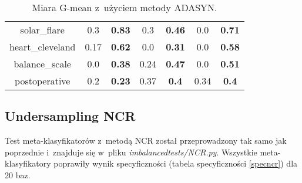 \begin{table}[H]
\begin{center}
{\begin{tabular}{c|cccccc}
					solar\_flare&0.3&\textbf{0.83}&0.3&\textbf{0.46}&0.0&\textbf{0.71}\\%
					heart\_cleveland&0.17&\textbf{0.62}&0.0&\textbf{0.31}&0.0&\textbf{0.58}\\%
					balance\_scale&0.0&\textbf{0.38}&0.24&\textbf{0.47}&0.0&\textbf{0.51}\\%
					postoperative&0.2&\textbf{0.23}&0.37&\textbf{0.4}&0.34&\textbf{0.4}\\%
				\end{tabular}}
				\caption{Miara G-mean z~użyciem metody ADASYN.}
				\label{gmeanadasyn}
			\end{center}
		\end{table}
		
\subsection{Undersampling NCR}
Test meta-klasyfikatorów z~metodą NCR został przeprowadzony tak samo jak poprzednie i~znajduje się w~pliku \textit{imbalancedtests/NCR.py}. Wszystkie meta-klasyfikatory poprawiły wynik specyficzności (tabela specyficzności \ref{specncr}) dla 20 baz.
